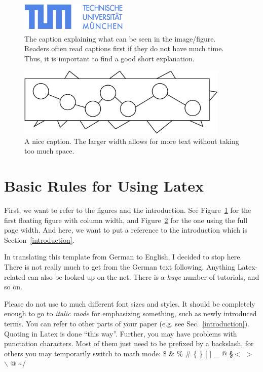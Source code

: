 \documentclass[A4,10pt]{article}
\begin{document}
\begin{figure}
\centerline{
\includegraphics[width=0.9\columnwidth]{TUM-Logo-102.png}
}
\caption{The caption explaining what can be seen in the image/figure.
Readers often read captions first if they do not have much time. Thus,
it is important to find a good short explanation.}
\label{TUM}
\end{figure}

\begin{figure}[t]
\centerline{
\includegraphics[width=0.9\textwidth]{test.pdf}
}
\caption{A nice caption. The larger width allows for more text without
taking too much space.}
\label{Fig2}
\end{figure}


\section{Basic Rules for Using Latex}

First, we want to refer to the figures and the introduction.
See Figure~\ref{TUM} for the first floating figure with column width,
and Figure~\ref{Fig2} for the one using the full page width.
And here, we want to put a reference to the introduction which is
Section~\ref{introduction}.

In translating this template from German to English, I decided to
stop here. There is not really much to get from the German text
following. Anything Latex-related can also be looked up on the
net. There is a {\it huge} number of tutorials, and so on.

Please do not use to much different font sizes and styles. It should
be completely enough to go to {\em italic mode} for emphasizing something,
such as newly introduced terms.
You can refer to other parts of your paper (e.g. see 
Sec.~\ref{introduction}).
Quoting in Latex is done ``this way''.
Further, you may have problems with punctation characters.
Most of them just need to be prefixed by a backslash, for others you may
temporarily switch to math mode:
\$ \& \% \# \{ \} [ ] \_ @ \S $<$ $>$ $\backslash$ @ \textasciitilde /
    
\end{document}
